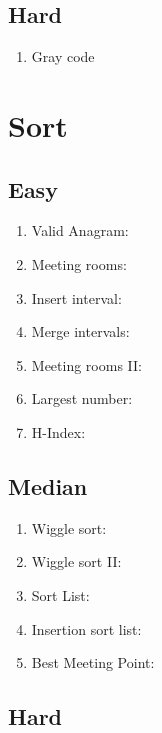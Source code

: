 \documentclass[DIV=calc, paper=a4, fontsize=11pt, twocolumn]{scrartcl}	 %
\begin{document}
\subsection*{Hard}
\begin{enumerate}
\item Gray code \cite{089} 
\end{enumerate}


\section*{Sort}

\subsection*{Easy}

\begin{enumerate}
\item Valid Anagram: \cite{242} 
\item Meeting rooms: \cite{252} 
\item Insert interval: \cite{057}
\item Merge intervals: \cite{056}
\item Meeting rooms II: \cite{253} 
\item Largest number: \cite{179} 
\item H-Index: \cite{274}
\end{enumerate}

\subsection*{Median}

\begin{enumerate}
\item Wiggle sort: \cite{280}
\item Wiggle sort II: \cite{324}
\item Sort List: \cite{148} 
\item Insertion sort list: \cite{147}
\item Best Meeting Point: \cite{296}

\end{enumerate}

\subsection*{Hard}
\end{document}
